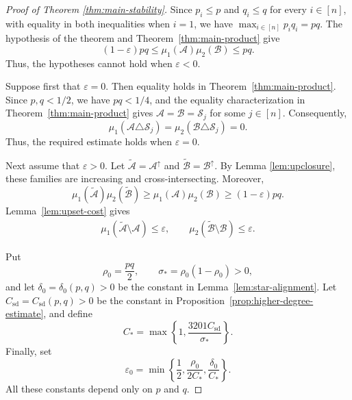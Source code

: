 \documentclass[11pt]{article}
\numberwithin{equation}{section}
\theoremstyle{definition}
\theoremstyle{remark}
\begin{document}
\begin{proof}[Proof of Theorem \ref{thm:main-stability}]
Since $p_i\leq p$ and $q_i\leq q$ for every $i\in[n]$, with equality
in both inequalities when $i=1$, we have
$
\max_{i\in[n]}p_iq_i=pq.
$
The hypothesis of the theorem and Theorem~\ref{thm:main-product}  give
$$
(1-\varepsilon)pq
\leq
\mu_1(\mathcal A)\mu_2(\mathcal B)
\leq
pq.
$$
Thus, the hypotheses cannot hold when $\varepsilon<0$.

Suppose first that $\varepsilon=0$. Then equality holds in
Theorem~\ref{thm:main-product}. Since $p,q<1/2$, we have $pq<1/4$, and the equality
characterization in Theorem~\ref{thm:main-product} gives
$
\mathcal A=\mathcal B=\mathcal S_j
$
for some $j\in[n]$.  Consequently,
$$
\mu_1(\mathcal A\triangle\mathcal S_j)
=
\mu_2(\mathcal B\triangle\mathcal S_j)
=
0.
$$
Thus, the required estimate holds when $\varepsilon=0$.


Next assume that $\varepsilon>0$.
Let
$
\widetilde{\mathcal A}=\mathcal A^\uparrow
$
and
$
\widetilde{\mathcal B}=\mathcal B^\uparrow.
$
By Lemma \ref{lem:upclosure}, these families are increasing and cross-intersecting.
Moreover,
$$
\mu_1(\widetilde{\mathcal A})
\mu_2(\widetilde{\mathcal B})
\geq
\mu_1(\mathcal A)\mu_2(\mathcal B)
\geq
(1-\varepsilon)pq.
$$
Lemma~\ref{lem:upset-cost} gives
\begin{align}
\mu_1(\widetilde{\mathcal A}\setminus\mathcal A)
\leq
\varepsilon,
\qquad
\mu_2(\widetilde{\mathcal B}\setminus\mathcal B)
\leq
\varepsilon.\label{f35}
\end{align}

Put
$$
\rho_0=\frac{pq}{2},
\qquad
\sigma_*=\rho_0(1-\rho_0)>0,
$$
and let $\delta_0=\delta_0(p,q)>0$ be the constant in
Lemma~\ref{lem:star-alignment}. Let
$C_{\mathrm{sd}}=C_{\mathrm{sd}}(p,q)>0$ be the constant in
Proposition~\ref{prop:higher-degree-estimate}, and define
$$
C_*=
\max\left\{
1,\frac{3201C_{\mathrm{sd}}}{\sigma_*}
\right\}.
$$
Finally, set
$$
\varepsilon_0
=
\min\left\{
\frac12,
\frac{\rho_0}{2C_*},
\frac{\delta_0}{C_*}
\right\}.
$$
All these constants depend only on $p$ and $q$.


\end{proof}
\end{document}
